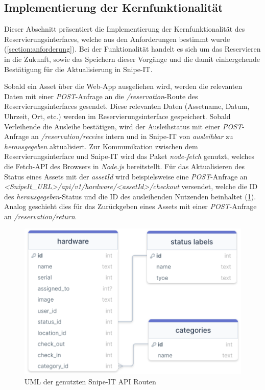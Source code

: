 \subsection{Implementierung der Kernfunktionalität}
\label{subsec:kernfkt}
Dieser Abschnitt präsentiert die Implementierung der Kernfunktionalität des
Reservierungsinterfaces, welche aus den Anforderungen bestimmt wurde (\ref{section:anforderung}).
Bei der Funktionalität handelt es sich um das Reservieren in die Zukunft, sowie das Speichern
dieser Vorgänge und die damit einhergehende Bestätigung für die Aktualisierung in Snipe-IT.


Sobald ein Asset über die Web-App ausgeliehen wird, werden die relevanten Daten mit einer
\textit{POST}-Anfrage an die \textit{/reservation}-Route des Reservierungsinterfaces gesendet.
Diese relevanten Daten (Assetname, Datum, Uhrzeit, Ort, etc.) werden im Reservierungsinterface
gespeichert. Sobald Verleihende die Ausleihe bestätigen, wird der Ausleihstatus mit einer
\textit{POST}-Anfrage an \textit{/reservation/receive} intern und in Snipe-IT von
\textit{ausleihbar} zu \textit{herausgegeben} aktualisiert. Zur Kommunikation zwischen dem
Reservierungsinterface und Snipe-IT wird das Paket \textit{node-fetch} genutzt, welches die
Fetch-API des Browsers in \textit{Node.js} bereitstellt. Für das Aktualisieren des Status eines
Assets mit der \textit{assetId} wird beispielsweise eine \textit{POST}-Anfrage an
\textit{<SnipeIt\_URL>/api/v1/hardware/<assetId>/checkout} versendet, welche die ID des
\textit{herausgegeben}-Status und die ID des ausleihenden Nutzenden beinhaltet (\ref{fig:server}).
Analog geschieht dies für das Zurückgeben eines Assets mit einer \textit{POST}-Anfrage an
\textit{/reservation/return}.
\begin{figure}[h]
  \centering
  \includegraphics[scale=0.45]{Bilder/Code/DB_RES_INT.png}
  \caption{UML der genutzten Snipe-IT API Routen}
  \label{fig:server}
\end{figure}

